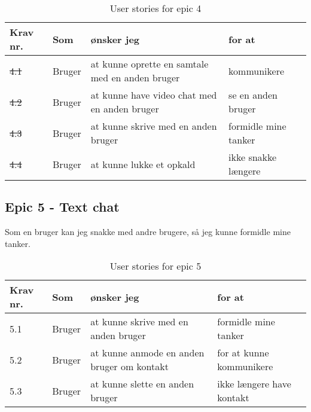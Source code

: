 \begin{table}[H]
    \centering
    \caption{User stories for epic 4}
    \label{tab:us-epic4}
    \begin{tabular}{p{1cm}|p{2cm}|p{6cm}|p{6cm}}
        \textbf{Krav nr.} & \textbf{Som} & \textbf{ønsker jeg}                             & \textbf{for at}      \\
        \hline
        \sout{4.1}               & Bruger       & at kunne oprette en samtale med en anden bruger & kommunikere          \\
        \hline
        \sout{4.2}               & Bruger       & at kunne have video chat med en anden bruger    & se en anden bruger   \\
        \hline
        \sout{4.3}               & Bruger       & at kunne skrive med en anden bruger             & formidle mine tanker \\
        \hline
        \sout{4.4}               & Bruger       & at kunne lukke et opkald                        & ikke snakke længere  \\
    \end{tabular}
\end{table}

\subsection{Epic 5 - Text chat}

Som en bruger kan jeg snakke med andre brugere, så jeg kunne formidle mine tanker.

\begin{table}[H]
    \centering
    \caption{User stories for epic 5}
    \label{tab:us-epic5}
    \begin{tabular}{p{1cm}|p{2cm}|p{6cm}|p{6cm}}
        \textbf{Krav nr.} & \textbf{Som} & \textbf{ønsker jeg}                        & \textbf{for at}           \\
        \hline
        5.1               & Bruger       & at kunne skrive med en anden bruger        & formidle mine tanker      \\
        \hline
        5.2               & Bruger       & at kunne anmode en anden bruger om kontakt & for at kunne kommunikere  \\
        \hline
        5.3               & Bruger       & at kunne slette en anden bruger            & ikke længere have kontakt \\
    \end{tabular}
\end{table}

